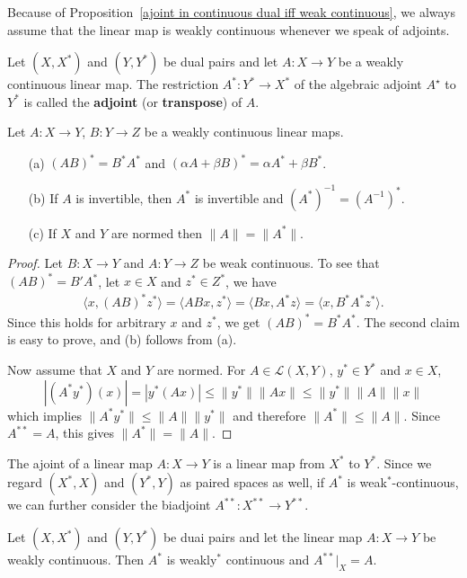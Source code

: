 Because of Proposition~\ref{ajoint in continuous dual iff weak continuous}, we always assume that the linear map is weakly continuous whenever we speak of adjoints.
\begin{definition}
Let $(X,X^*)$ and $(Y,Y^*)$ be dual pairs and let $A:X\to Y$ be a weakly continuous linear map. The restriction $A^*:Y^*\to X^*$ of the algebraic adjoint $A^{\star}$ to $Y^*$ is called the \textbf{adjoint} (or \textbf{transpose}) of $A$.
\end{definition}
\begin{proposition}\label{TVS adjoint prop}
Let $A:X\to Y$, $B:Y\to Z$ be a weakly continuous linear maps.
\begin{itemize}
\item[(a)] $(AB)^*=B^*A^*$ and $(\alpha A+\beta B)^*=\alpha A^*+\beta B^*$.
\item[(b)] If $A$ is invertible, then $A^*$ is invertible and $(A^*)^{-1}=(A^{-1})^*$.
\item[(c)] If $X$ and $Y$ are normed then $\|A\|=\|A^*\|$.
\end{itemize}
\end{proposition}
\begin{proof}
Let $B:X\to Y$ and $A:Y\to Z$ be weak continuous. To see that $(AB)^*=B'A^*$, let $x\in X$ and $z^*\in Z^*$, we have
\begin{align*}
\langle x,(AB)^*z^*\rangle=\langle ABx,z^*\rangle=\langle Bx,A^*z\rangle=\langle x,B^*A^*z^*\rangle.
\end{align*}
Since this holds for arbitrary $x$ and $z^*$, we get $(AB)^*=B^*A^*$. The second claim is easy to prove, and (b) follows from (a).\par
Now assume that $X$ and $Y$ are normed. For $A\in\mathcal{L}(X,Y)$, $y^*\in Y^*$ and $x\in X$,
\[|(A^*y^*)(x)|=|y^*(Ax)|\leq\|y^*\|\|Ax\|\leq\|y^*\|\|A\|\|x\|\]
which implies $\|A^*y^*\|\leq\|A\|\|y^*\|$ and therefore $\|A^*\|\leq\|A\|$. Since $A^{**}=A$, this gives $\|A^*\|=\|A\|$. 
\end{proof}
The ajoint of a linear map $A:X\to Y$ is a linear map from $X^*$ to $Y^*$. Since we regard $(X^*,X)$ and $(Y^*,Y)$ as paired spaces as well, if $A^*$ is weak$^*$-continuous, we can further consider the biadjoint $A^{**}:X^{**}\to Y^{**}$.
\begin{proposition}\label{adjoint involutive}
Let $(X,X^*)$ and $(Y,Y^*)$ be duai pairs and let the linear map $A:X\to Y$ be weakly continuous. Then $A^*$ is weakly$^*$ continuous and $A^{**}|_{X}=A$.
\end{proposition}
